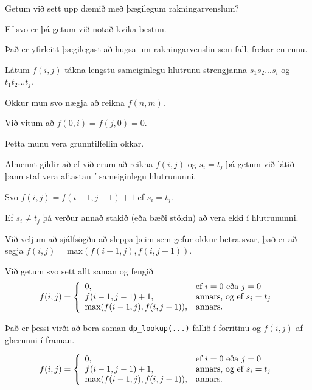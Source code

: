 {
	{
		\item<1-> Getum við sett upp dæmið með þægilegum rakningarvenslum?
		\item<2-> Ef svo er þá getum við notað kvika bestun.
		\item<3-> Það er yfirleitt þægilegast að hugsa um rakningarvenslin sem fall, frekar en runu.
		\item<4-> Látum $f(i, j)$ tákna lengstu sameiginlegu hlutrunu strengjanna $s_1s_2...s_i$ og $t_1t_2...t_j$.
		\item<5-> Okkur mun svo nægja að reikna $f(n, m)$.
	}
}

{
	{
		\item<1-> Við vitum að $f(0, i) = f(j, 0) = 0$.
		\item<2-> Þetta munu vera grunntilfellin okkar.
		\item<3-> Almennt gildir að ef við erum að reikna $f(i, j)$ og $s_i = t_j$ þá getum við látið þann staf vera aftastan í sameiginlegu hlutrununni.
		\item<4-> Svo $f(i, j) = f(i - 1, j - 1) + 1$ ef $s_i = t_j$.
		\item<5-> Ef $s_i \neq t_j$ þá verður annað stakið (eða bæði stökin) að vera ekki í hlutrununni.
		\item<6-> Við veljum að sjálfsögðu að sleppa þeim sem gefur okkur betra svar, það er að segja $f(i, j) = \text{max}(f(i - 1, j), f(i, j - 1))$.
		\item<7-> Við getum svo sett allt saman og fengið
		\[
			f(i, j) =
			\left \{
			\env{array}
			{
				{l l}
				0, & \text{ef $i = 0$ eða $j = 0$}\\
				f(i - 1, j - 1) + 1, & \text{annars, og ef $s_i = t_j$}\\
				\text{max}(f(i - 1, j), f(i, j - 1)), & \text{annars}.
			}
			\right .
		\]
	}
}

{
}

{
	{
		\item<1-> Það er þessi virði að bera saman \texttt{dp\_lookup(...)} fallið í forritinu og $f(i, j)$ af glærunni í framan.
	}
	\[
		f(i, j) =
		\left \{
		\env{array}
		{
			{l l}
			0, & \text{ef $i = 0$ eða $j = 0$}\\
			f(i - 1, j - 1) + 1, & \text{annars, og ef $s_i = t_j$}\\
			\text{max}(f(i - 1, j), f(i, j - 1)), & \text{annars}.
		}
		\right .
	\]
}

